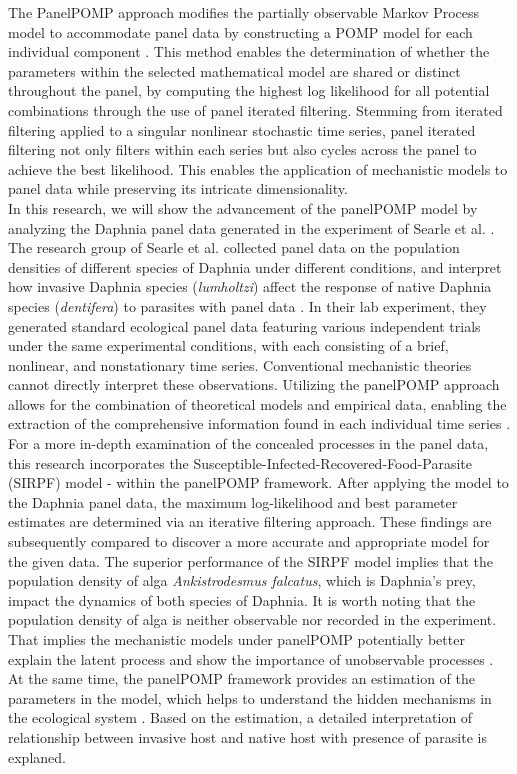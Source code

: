 \documentclass[12pt]{article}
\begin{document}
The PanelPOMP approach modifies the partially observable Markov Process model to accommodate panel data by constructing a POMP model for each individual component \citep{King2016}. This method enables the determination of whether the parameters within the selected mathematical model are shared or distinct throughout the panel, by computing the highest log likelihood for all potential combinations through the use of panel iterated filtering. Stemming from iterated filtering \citep{King2016} applied to a singular nonlinear stochastic time series, panel iterated filtering not only filters within each series but also cycles across the panel to achieve the best likelihood. This enables the application of mechanistic models to panel data while preserving its intricate dimensionality.\\

In this research, we will show the advancement of the panelPOMP model by analyzing the Daphnia panel data generated in the experiment of Searle et al. \citep{Searle2016}. The research group of Searle et al. collected panel data on the population densities of different species of Daphnia under different conditions, and interpret how invasive Daphnia species (\textit{lumholtzi}) affect the response of native Daphnia species (\textit{dentifera}) to parasites with panel data \citep{Searle2016}. In their lab experiment, they generated standard ecological panel data featuring various independent trials under the same experimental conditions, with each consisting of a brief, nonlinear, and nonstationary time series. Conventional mechanistic theories cannot directly interpret these observations. Utilizing the panelPOMP approach allows for the combination of theoretical models and empirical data, enabling the extraction of the comprehensive information found in each individual time series \citep{Carles2020}.\\

For a more in-depth examination of the concealed processes in the panel data, this research incorporates the Susceptible-Infected-Recovered-Food-Parasite (SIRPF) model - within the panelPOMP framework. After applying the model to the Daphnia panel data, the maximum log-likelihood and best parameter estimates are determined via an iterative filtering approach. These findings are subsequently compared to discover a more accurate and appropriate model for the given data. The superior performance of the SIRPF model implies that the population density of alga \textit{Ankistrodesmus falcatus}, which is Daphnia's prey, impact the dynamics of both species of Daphnia. It is worth noting that the population density of alga is neither observable nor recorded in the experiment. That implies the mechanistic models under panelPOMP potentially better explain the latent process and show the importance of unobservable processes \citep{Edwards2012}. At the same time, the panelPOMP framework provides an estimation of the parameters in the model, which helps to understand the hidden mechanisms in the ecological system \citep{Carles2020}. Based on the estimation, a detailed interpretation of relationship between invasive host and native host with presence of parasite is explaned.\\
\end{document}
